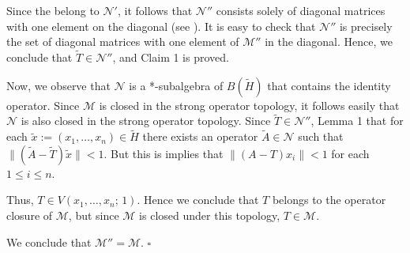 \documentclass[12pt]{article}
\begin{document}
Since the  belong to $\mathcal{N}'$, it follows that $\mathcal{N}''$ consists solely of diagonal matrices with one element on the diagonal (see ). It is easy to check that $\mathcal{N}''$ is precisely the set of diagonal matrices with one element of $\mathcal{M}''$ in the diagonal. Hence, we conclude that $\widetilde{T} \in \mathcal{N}''$, and Claim 1 is proved.

Now, we observe that $\mathcal{N}$ is a *-subalgebra of $B(\widetilde{H})$ that contains the identity operator. Since $\mathcal{M}$ is closed in the strong operator topology, it follows easily that $\mathcal{N}$ is also closed in the strong operator topology. Since $\widetilde{T} \in \mathcal{N}''$, Lemma 1  that for each $\widetilde{x} := (x_1, \dots, x_n) \in \widetilde{H}$ there exists an operator $\widetilde{A} \in \mathcal{N}$ such that $\|(\widetilde{A}- \widetilde{T})\widetilde{x}\| < 1$. But this is implies that $\|(A-T)x_i\| < 1$ for each $1 \leq i \leq n$.

Thus, $T \in V(x_1, \dots, x_n;\, 1)$. Hence we conclude that $T$ belongs to the  operator closure of $\mathcal{M}$, but since $\mathcal{M}$ is closed under this topology, $T \in \mathcal{M}$.

We conclude that $\mathcal{M}'' = \mathcal{M}$. $\square$
\end{document}
